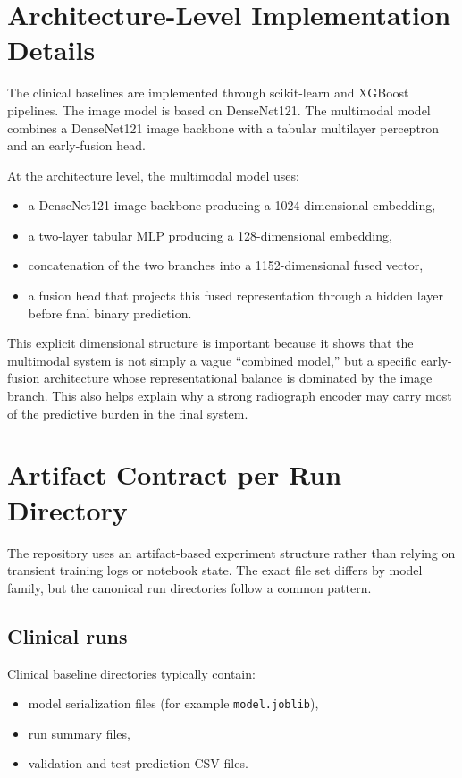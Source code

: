 \section{Architecture-Level Implementation Details}

The clinical baselines are implemented through scikit-learn and XGBoost pipelines. The image model is based on DenseNet121. The multimodal model combines a DenseNet121 image backbone with a tabular multilayer perceptron and an early-fusion head.

At the architecture level, the multimodal model uses:

\begin{itemize}
    \item a DenseNet121 image backbone producing a 1024-dimensional embedding,
    \item a two-layer tabular MLP producing a 128-dimensional embedding,
    \item concatenation of the two branches into a 1152-dimensional fused vector,
    \item a fusion head that projects this fused representation through a hidden layer before final binary prediction.
\end{itemize}

This explicit dimensional structure is important because it shows that the multimodal system is not simply a vague ``combined model,'' but a specific early-fusion architecture whose representational balance is dominated by the image branch. This also helps explain why a strong radiograph encoder may carry most of the predictive burden in the final system.

\section{Artifact Contract per Run Directory}

The repository uses an artifact-based experiment structure rather than relying on transient training logs or notebook state. The exact file set differs by model family, but the canonical run directories follow a common pattern.

\subsection*{Clinical runs}
Clinical baseline directories typically contain:
\begin{itemize}
    \item model serialization files (for example \texttt{model.joblib}),
    \item run summary files,
    \item validation and test prediction CSV files.
\end{itemize}

